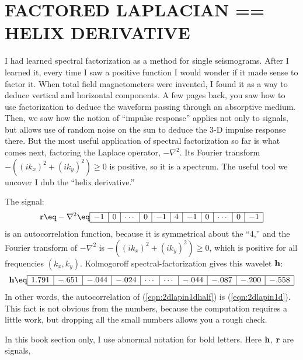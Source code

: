 \section{FACTORED LAPLACIAN == HELIX DERIVATIVE}
I had learned spectral factorization as a method for single seismograms.
After I learned it,
every time I saw a positive function
I would wonder if it made sense to factor it.
When total field
magnetometers were invented,
I found it as a way to deduce vertical and horizontal
components.
A few pages back, you saw how to use factorization
to deduce the waveform passing through an absorptive medium.
Then, we saw how the notion of ``impulse response''
applies not only to signals,
but allows use of random noise on the sun
to deduce the 3-D impulse response there.
But the most useful application of spectral factorization so far
is what comes next, factoring the Laplace operator, $-\nabla^2$.
Its Fourier transform $-((ik_x)^2+(ik_y)^2) \ge 0$ is positive, so it is a spectrum.
The useful tool we uncover I dub the ``helix derivative.''
\par
The signal:
\begin{equation}
\label{eqn:2dlapin1d}
\bold r \eq
-\nabla^2
\eq
\begin{array}{|r|r|r|r|r|r|r|r|r|r|r|r|r|r|r|} \hline
-1&0&\cdots&0&-1&4&-1&0& \cdots&0&-1
\\ \hline
\end{array}
\end{equation}
is an autocorrelation function, because
it is symmetrical about the ``4,''
and the Fourier transform of $-\nabla^2$ is $-((ik_x)^2+(ik_y)^2) \ge 0$,
which is positive for all frequencies $(k_x,k_y)$.
Kolmogoroff spectral-factorization gives this wavelet $\bold h $:
\begin{equation}
\label{eqn:2dlapin1dhalf}
{\bold h}
\eq
\begin{array}{|r|r|r|r|r|r|r|r|r|r|r|r|r|r|r|}
\hline
1.791&-.651&-.044&-.024&\cdots&\cdots&-.044&-.087&-.200&-.558 \\
\hline
\end{array}
\end{equation}
In other words,
the autocorrelation of
(\ref{eqn:2dlapin1dhalf}) is
(\ref{eqn:2dlapin1d}).
This fact is not obvious from the numbers,
because the computation requires a little work,
but dropping all the small numbers
allows you a rough check.
\par
In this book section only, 
I use abnormal notation for bold letters.
Here
$\bold h$, $\bold r$ are signals,
